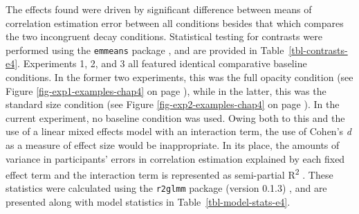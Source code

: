 \documentclass[../main.tex]{subfiles}
\begin{document}
\begin{table}

\caption{\label{tbl-contrasts-e4}Contrasts between different levels of
the opacity and size decay factors in Experiment 4. TO = Typical
Orientation. IO = Inverted Orientation.}


\end{table}%

The effects found were driven by significant difference between means of
correlation estimation error between all conditions besides that which
compares the two incongruent decay conditions. Statistical testing for
contrasts were performed using the \texttt{emmeans} package
\cite{lenth_2024}, and are provided in Table~\ref{tbl-contrasts-e4}.
Experiments 1, 2, and 3 all featured identical comparative baseline
conditions. In the former two experiments, this was the full opacity
condition (see Figure \ref{fig-exp1-examples-chap4} on page
\pageref{fig-exp1-examples-chap4}), while in the latter, this was the
standard size condition (see Figure \ref{fig-exp2-examples-chap4} on
page \pageref{fig-exp3-examples-chap5}). In the current experiment, no
baseline condition was used. Owing both to this and the use of a linear
mixed effects model with an interaction term, the use of Cohen's
\emph{d} as a measure of effect size would be inappropriate. In its
place, the amounts of variance in participants' errors in correlation
estimation explained by each fixed effect term and the interaction term
is represented as semi-partial R\textsuperscript{2}
\cite{nakagawa_2013}. These statistics were calculated using the
\texttt{r2glmm} package (version 0.1.3) \cite{r2glmm}, and are presented
along with model statistics in Table~\ref{tbl-model-stats-e4}.
\end{document}
